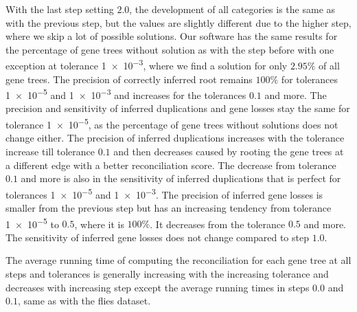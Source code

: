 With the last step setting $2.0$, the development of all categories is the same as with the previous step, but the values are slightly different due to the higher step, where we skip a lot of possible solutions. Our software has the same results for the percentage of gene trees without solution as with the step before with one exception at tolerance \num{1e-3}, where we find a solution for only $2.95\%$ of all gene trees. The precision of correctly inferred root remains $100\%$ for tolerances \num{1e-5} and \num{1e-3} and increases for the tolerances $0.1$ and more. The precision and sensitivity of inferred duplications and gene losses stay the same for tolerance \num{1e-5}, as the percentage of gene trees without solutions does not change either. The precision of inferred duplications increases with the tolerance increase till tolerance $0.1$ and then decreases caused by rooting the gene trees at a different edge with a better reconciliation score. The decrease from tolerance $0.1$ and more is also in the sensitivity of inferred duplications that is perfect for tolerances \num{1e-5} and \num{1e-3}. The precision of inferred gene losses is smaller from the previous step but has an increasing tendency from tolerance \num{1e-5} to $0.5$, where it is $100\%$. It decreases from the tolerance $0.5$ and more. The sensitivity of inferred gene losses does not change compared to step $1.0$.

The average running time of computing the reconciliation for each gene tree at all steps and tolerances is generally increasing with the increasing tolerance and decreases with increasing step except the average running times in steps $0.0$ and $0.1$, same as with the flies dataset.

